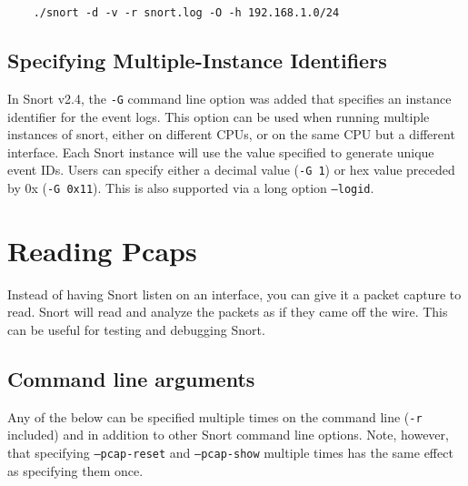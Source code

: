 \documentclass[english]{report}
\begin{document}
\begin{verbatim}
    ./snort -d -v -r snort.log -O -h 192.168.1.0/24
\end{verbatim}

\subsection{Specifying Multiple-Instance Identifiers}

In Snort v2.4, the \texttt{-G} command line option was added that specifies an
instance identifier for the event logs.  This option can be used when running
multiple instances of snort, either on different CPUs, or on the same CPU but a
different interface.  Each Snort instance will use the value specified to
generate unique event IDs.  Users can specify either a decimal value
(\texttt{-G 1}) or hex value preceded by 0x (\texttt{-G 0x11}).  This is also
supported via a long option \texttt{--logid}.

\section{Reading Pcaps}

Instead of having Snort listen on an interface, you can give it a packet
capture to read.  Snort will read and analyze the packets as if they came off
the wire.  This can be useful for testing and debugging Snort.

\subsection{Command line arguments}

Any of the below can be specified multiple times on the command line
(\texttt{-r} included) and in addition to other Snort command line options.
Note, however, that specifying \texttt{--pcap-reset} and \texttt{--pcap-show}
multiple times has the same effect as specifying them once.
\end{document}
